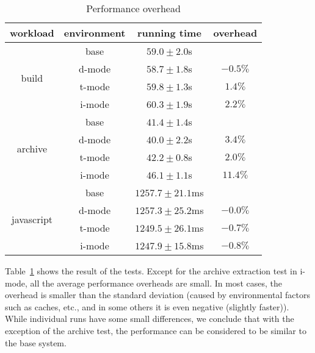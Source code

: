 
\begin{table}[tb]
\centering
\begin{tabular}{|c|c|c|c|}
\hline
workload & environment & running time & overhead \\ \hline \hline
\multirow{4}{*}{build} &
  base   & $59.0\pm2.0$s & \\ \cline{2-4}
& d-mode & $58.7\pm1.8$s & $-0.5\%$ \\ \cline{2-4}
& t-mode & $59.8\pm1.3$s & $1.4\%$ \\ \cline{2-4}
& i-mode & $60.3\pm1.9$s & $2.2\%$ \\ \hline
\multirow{4}{*}{archive} &
  base   & $41.4\pm1.4$s & \\ \cline{2-4}
& d-mode & $40.0\pm2.2$s & $3.4\%$ \\ \cline{2-4}
& t-mode & $42.2\pm0.8$s & $2.0\%$ \\ \cline{2-4}
& i-mode & $46.1\pm1.1$s & $11.4\%$ \\ \hline
\multirow{4}{*}{javascript} &
  base   & $1257.7\pm21.1$ms & \\ \cline{2-4}
& d-mode & $1257.3\pm25.2$ms & $-0.0\%$ \\ \cline{2-4}
& t-mode & $1249.5\pm26.1$ms & $-0.7\%$ \\ \cline{2-4}
& i-mode & $1247.9\pm15.8$ms & $-0.8\%$ \\ \hline
\end{tabular}
\caption{Performance overhead}
\label{table:binint-benchmark}
\end{table}

Table~\ref{table:binint-benchmark} shows the result of the tests.
Except for the archive extraction test in i-mode,
all the average performance overheads are small.
In most cases, the overhead is smaller than the standard deviation
(caused by environmental factors such as caches, etc., and in some
others it is even negative (slightly faster)).
While individual runs have some small differences, we conclude that
with the exception of the archive test, the performance can be considered to
be similar to the base system.

